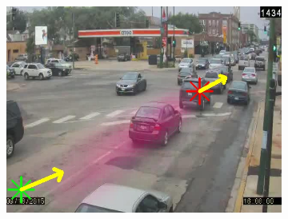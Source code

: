 \begin{figure}
\begin{subfigure}{0.32\linewidth}
            \includegraphics[width=\linewidth]{./img/scene_learning/res/diverseyWestern/diverseyWestern-2.jpg}
        \end{subfigure}


\end{figure}

